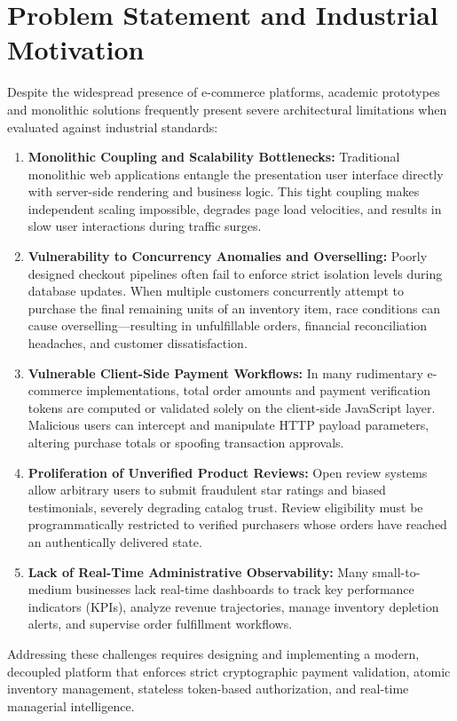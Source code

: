 \section{Problem Statement and Industrial Motivation}
Despite the widespread presence of e-commerce platforms, academic prototypes and monolithic solutions frequently present severe architectural limitations when evaluated against industrial standards:
\begin{enumerate}[leftmargin=2.0em]
    \item \textbf{Monolithic Coupling and Scalability Bottlenecks:} Traditional monolithic web applications entangle the presentation user interface directly with server-side rendering and business logic. This tight coupling makes independent scaling impossible, degrades page load velocities, and results in slow user interactions during traffic surges.
    \item \textbf{Vulnerability to Concurrency Anomalies and Overselling:} Poorly designed checkout pipelines often fail to enforce strict isolation levels during database updates. When multiple customers concurrently attempt to purchase the final remaining units of an inventory item, race conditions can cause overselling—resulting in unfulfillable orders, financial reconciliation headaches, and customer dissatisfaction.
    \item \textbf{Vulnerable Client-Side Payment Workflows:} In many rudimentary e-commerce implementations, total order amounts and payment verification tokens are computed or validated solely on the client-side JavaScript layer. Malicious users can intercept and manipulate HTTP payload parameters, altering purchase totals or spoofing transaction approvals.
    \item \textbf{Proliferation of Unverified Product Reviews:} Open review systems allow arbitrary users to submit fraudulent star ratings and biased testimonials, severely degrading catalog trust. Review eligibility must be programmatically restricted to verified purchasers whose orders have reached an authentically delivered state.
    \item \textbf{Lack of Real-Time Administrative Observability:} Many small-to-medium businesses lack real-time dashboards to track key performance indicators (KPIs), analyze revenue trajectories, manage inventory depletion alerts, and supervise order fulfillment workflows.
\end{enumerate}

\noindent Addressing these challenges requires designing and implementing a modern, decoupled platform that enforces strict cryptographic payment validation, atomic inventory management, stateless token-based authorization, and real-time managerial intelligence.

